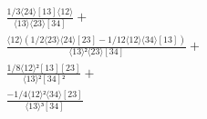 \documentclass[varwidth, border=5pt]{standalone}
\begin{document}
\begin{my}
$\begin{gathered}
\scriptscriptstyle\frac{1/3⟨24⟩[13]⟨12⟩}{⟨13⟩⟨23⟩[34]} +\\
\scriptscriptstyle\frac{⟨12⟩(1/2⟨23⟩⟨24⟩[23]-1/12⟨12⟩⟨34⟩[13])}{⟨13⟩²⟨23⟩[34]} +\\
\scriptscriptstyle\frac{1/8⟨12⟩²[13][23]}{⟨13⟩²[34]²} +\\
\scriptscriptstyle\frac{-1/4⟨12⟩²⟨34⟩[23]}{⟨13⟩³[34]} \phantom{+}
\end{gathered}$
\end{my}
\end{document}
